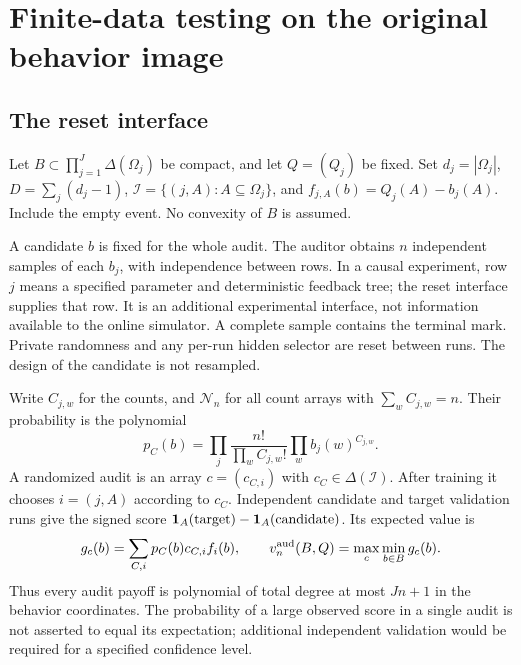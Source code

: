 \section{Finite-data testing on the original behavior image}
\label{sec:v18-audit}
\subsection{The reset interface}
Let $B\subset\prod_{j=1}^J\Delta(\Omega_j)$ be compact, and let
$Q=(Q_j)$ be fixed. Set $d_j=|\Omega_j|$, $D=\sum_j(d_j-1)$,
$\mathcal I=\{(j,A):A\subseteq\Omega_j\}$, and
$f_{j,A}(b)=Q_j(A)-b_j(A)$. Include the empty event. No convexity of $B$
is assumed.

A candidate $b$ is fixed for the whole audit. The auditor obtains $n$
independent samples of each $b_j$, with independence between rows.
In a causal experiment, row $j$ means a specified parameter and deterministic
feedback tree; the reset interface supplies that row. It is an additional
experimental interface, not information available to the online simulator.
A complete sample contains the terminal mark. Private randomness and any
per-run hidden selector are reset between runs. The design of the candidate
is not resampled.

Write $C_{j,w}$ for the counts, and $\mathcal N_n$ for all count arrays
with $\sum_wC_{j,w}=n$. Their probability is the polynomial
\[
 p_C(b)=\prod_j\frac{n!}{\prod_w C_{j,w}!}
                    \prod_w b_j(w)^{C_{j,w}}.
\]
A randomized audit is an array $c=(c_{C,i})$ with $c_C\in\Delta(\mathcal I)$.
After training it chooses $i=(j,A)$ according to $c_C$. Independent candidate
and target validation runs give the signed score
$\mathbf 1_A(\hbox{target})-\mathbf 1_A(\hbox{candidate})$. Its expected value is
\begin{equation}\label{eq:v18-auditpayoff}
 g_c(b)=\sum_{C,i}p_C(b)c_{C,i}f_i(b),\qquad
 v^{\rm aud}_n(B,Q)=\max_c\min_{b\in B}g_c(b).
\end{equation}
Thus every audit payoff is polynomial of total degree at most $Jn+1$ in
the behavior coordinates. The probability of a large observed score in a
single audit is not asserted to equal its expectation; additional
independent validation would be required for a specified confidence level.

